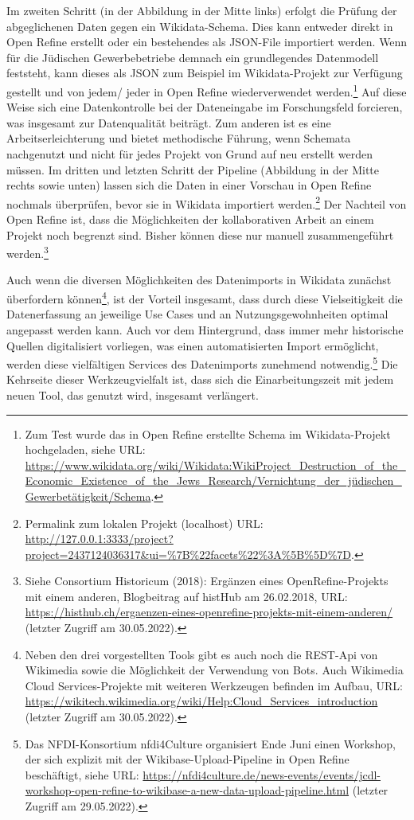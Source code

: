 Im zweiten Schritt (in der Abbildung in der Mitte links) erfolgt die Prüfung der abgeglichenen Daten gegen ein Wikidata-Schema. Dies kann entweder direkt in Open Refine erstellt oder ein bestehendes als JSON-File importiert werden. Wenn für die Jüdischen Gewerbebetriebe demnach ein grundlegendes Datenmodell feststeht, kann dieses als JSON zum Beispiel im Wikidata-Projekt zur Verfügung gestellt und von jedem/ jeder in Open Refine wiederverwendet werden.\footnote{Zum Test wurde das in Open Refine erstellte Schema im Wikidata-Projekt hochgeladen, siehe URL: \url{https://www.wikidata.org/wiki/Wikidata:WikiProject\_Destruction\_of\_the\_Economic\_Existence\_of\_the\_Jews\_Research/Vernichtung\_der\_jüdischen\_Gewerbetätigkeit/Schema}.} Auf diese Weise sich eine Datenkontrolle bei der Dateneingabe im Forschungsfeld forcieren, was insgesamt zur Datenqualität beiträgt. Zum anderen ist es eine Arbeitserleichterung und bietet methodische Führung, wenn Schemata nachgenutzt und nicht für jedes Projekt von Grund auf neu erstellt werden müssen. Im dritten und letzten Schritt der Pipeline (Abbildung in der Mitte rechts sowie unten) lassen sich die Daten in einer Vorschau in Open Refine nochmals überprüfen, bevor sie in Wikidata importiert werden.\footnote{Permalink zum lokalen Projekt (localhost) URL: \url{http://127.0.0.1:3333/project?project=2437124036317\&ui=\%7B\%22facets\%22\%3A\%5B\%5D\%7D}.} Der Nachteil von Open Refine ist, dass die Möglichkeiten der kollaborativen Arbeit an einem Projekt noch begrenzt sind. Bisher können diese nur manuell zusammengeführt werden.\footnote{Siehe Consortium Historicum (2018): Ergänzen eines OpenRefine-Projekts mit einem anderen, Blogbeitrag auf histHub am 26.02.2018, URL: \url{https://histhub.ch/ergaenzen-eines-openrefine-projekts-mit-einem-anderen/} (letzter Zugriff am 30.05.2022).} 

Auch wenn die diversen Möglichkeiten des Datenimports in Wikidata zunächst überfordern können\footnote{Neben den drei vorgestellten Tools gibt es auch noch die REST-Api von Wikimedia sowie die Möglichkeit der Verwendung von Bots. Auch Wikimedia Cloud Services-Projekte mit weiteren Werkzeugen befinden im Aufbau, URL: \url{https://wikitech.wikimedia.org/wiki/Help:Cloud_Services_introduction} (letzter Zugriff am 30.05.2022).}, ist der Vorteil insgesamt, dass durch diese Vielseitigkeit die Datenerfassung an jeweilige Use Cases und an Nutzungsgewohnheiten optimal angepasst werden kann. Auch vor dem Hintergrund, dass immer mehr historische Quellen digitalisiert vorliegen, was einen automatisierten Import ermöglicht, werden diese vielfältigen Services des Datenimports zunehmend notwendig.\footnote{Das NFDI-Konsortium nfdi4Culture organisiert Ende Juni einen Workshop, der sich explizit mit der Wikibase-Upload-Pipeline in Open Refine beschäftigt, siehe URL: \url{https://nfdi4culture.de/news-events/events/jcdl-workshop-open-refine-to-wikibase-a-new-data-upload-pipeline.html} (letzter Zugriff am 29.05.2022).} Die Kehrseite dieser Werkzeugvielfalt ist, dass sich die Einarbeitungszeit mit jedem neuen Tool, das genutzt wird, insgesamt verlängert.

